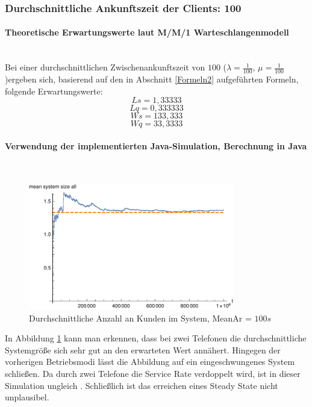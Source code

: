 \subsubsection{Durchschnittliche Ankunftszeit der Clients: 100}
\paragraph{Theoretische Erwartungswerte laut M/M/1 Warteschlangenmodell}
\\
Bei einer durchschnittlichen Zwischenankunftszeit von $100$ ($\lambda=\frac{1}{100}$, $\mu=\frac{1}{100}$)ergeben sich, basierend auf den in Abschnitt \ref{Formeln2} aufgeführten Formeln, folgende Erwartungswerte:
\begin{equation}
Ls=1,33333
\end{equation}
\begin{equation}
Lq=0,333333
\end{equation}
\begin{equation}
Ws=133,333
\end{equation}
\begin{equation}
Wq=33,3333
\end{equation}

\paragraph{Verwendung der implementierten Java-Simulation, Berechnung in Java}
\label{JavaTwoPhones100}
\\
\begin{figure}[htpb]
	\centering
	\includegraphics[width=0.8\textwidth]{abbildungen/2_Phone_VIP/Arrival_100_Serve_100_dur_1000000_Skip_0/MeanSystemSizeAll.pdf}
	\caption{Durchschnittliche Anzahl an Kunden im System, MeanAr = $100s$}
	\label{fig:mean3SystemSize100}
\end{figure}

In Abbildung \ref{fig:mean3SystemSize100} kann man erkennen, dass bei zwei Telefonen die durchschnittliche Systemgröße sich sehr gut an den erwarteten Wert annähert. Hingegen der vorherigen Betriebsmodi lässt die Abbildung auf ein eingeschwungenes System schließen. Da durch zwei Telefone die Service Rate verdoppelt wird, ist in dieser Simulation \mu ungleich \lamda. Schließlich ist das erreichen eines Steady State nicht unplausibel.

